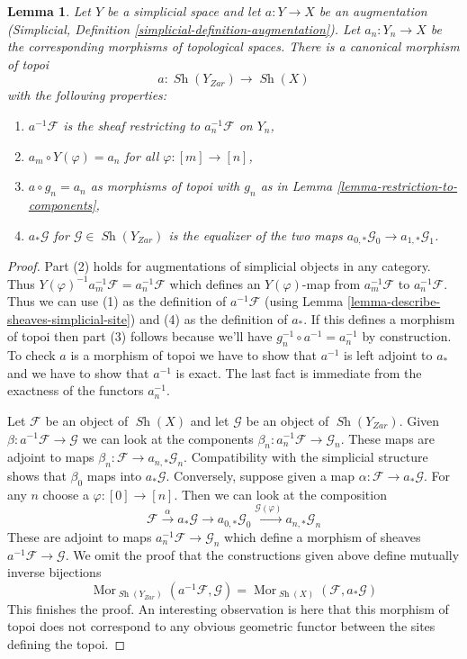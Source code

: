 \documentclass{stacks-project}
\theoremstyle{plain}
\newtheorem{lemma}[subsection]{Lemma}
\theoremstyle{definition}
\theoremstyle{remark}
\numberwithin{equation}{subsection}
\def\Mor{\mathop{\mathrm{Mor}}\nolimits}
\def\Sh{\mathop{\mathit{Sh}}\nolimits}
\begin{document}
\begin{lemma}
\label{lemma-augmentation}
Let $Y$ be a simplicial space and let $a : Y \to X$ be an augmentation
(Simplicial, Definition \ref{simplicial-definition-augmentation}).
Let $a_n : Y_n \to X$ be the corresponding morphisms of topological spaces.
There is a canonical morphism of topoi
$$
a : \Sh(Y_{Zar}) \to \Sh(X)
$$
with the following properties:
\begin{enumerate}
\item $a^{-1}\mathcal{F}$ is the sheaf restricting to $a_n^{-1}\mathcal{F}$
on $Y_n$,
\item $a_m \circ Y(\varphi) = a_n$ for all $\varphi : [m] \to [n]$,
\item $a \circ g_n = a_n$ as morphisms of topoi with
$g_n$ as in Lemma \ref{lemma-restriction-to-components},
\item $a_*\mathcal{G}$ for $\mathcal{G} \in \Sh(Y_{Zar})$
is the equalizer of the two maps
$a_{0, *}\mathcal{G}_0 \to a_{1, *}\mathcal{G}_1$.
\end{enumerate}
\end{lemma}

\begin{proof}
Part (2) holds for augmentations of simplicial objects in any category.
Thus $Y(\varphi)^{-1} a_m^{-1} \mathcal{F} = a_n^{-1}\mathcal{F}$
which defines an $Y(\varphi)$-map from $a_m^{-1}\mathcal{F}$
to $a_n^{-1}\mathcal{F}$.
Thus we can use (1) as the definition of $a^{-1}\mathcal{F}$ (using
Lemma \ref{lemma-describe-sheaves-simplicial-site}) and
(4) as the definition of $a_*$. If this defines a morphism of topoi
then part (3) follows because we'll have $g_n^{-1} \circ a^{-1} = a_n^{-1}$
by construction. To check $a$ is a morphism of topoi we have to show
that $a^{-1}$ is left adjoint to $a_*$ and we have to show that
$a^{-1}$ is exact. The last fact is immediate from the exactness of
the functors $a_n^{-1}$.

\medskip\noindent
Let $\mathcal{F}$ be an object of $\Sh(X)$ and let $\mathcal{G}$
be an object of $\Sh(Y_{Zar})$. Given
$\beta : a^{-1}\mathcal{F} \to \mathcal{G}$ we can look at the
components $\beta_n : a_n^{-1}\mathcal{F} \to \mathcal{G}_n$.
These maps are adjoint to maps
$\beta_n : \mathcal{F} \to a_{n, *}\mathcal{G}_n$.
Compatibility with the simplicial structure shows that
$\beta_0$ maps into $a_*\mathcal{G}$.
Conversely, suppose given a map $\alpha : \mathcal{F} \to a_*\mathcal{G}$.
For any $n$ choose a $\varphi : [0] \to [n]$. Then we can look at
the composition
$$
\mathcal{F} \xrightarrow{\alpha} a_*\mathcal{G}
\to a_{0, *}\mathcal{G}_0 \xrightarrow{\mathcal{G}(\varphi)}
a_{n, *}\mathcal{G}_n
$$
These are adjoint to maps $a_n^{-1}\mathcal{F} \to \mathcal{G}_n$
which define a morphism of sheaves $a^{-1}\mathcal{F} \to \mathcal{G}$.
We omit the proof that the constructions given above define
mutually inverse bijections
$$
\Mor_{\Sh(Y_{Zar})}(a^{-1}\mathcal{F}, \mathcal{G}) =
\Mor_{\Sh(X)}(\mathcal{F}, a_*\mathcal{G})
$$
This finishes the proof. An interesting observation is here that
this morphism of topoi does not correspond to any obvious geometric
functor between the sites defining the topoi.
\end{proof}
\end{document}

